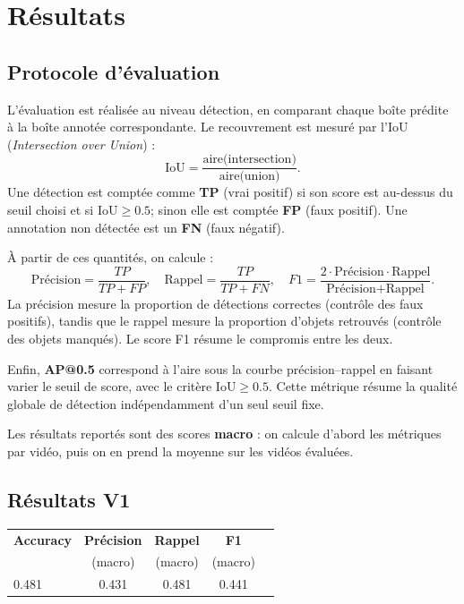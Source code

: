 \documentclass{article}
\begin{document}
\section{Résultats}
\subsection{Protocole d’évaluation}
L’évaluation est réalisée au niveau détection, en comparant chaque boîte prédite à la boîte annotée correspondante. Le recouvrement est mesuré par l’IoU (\textit{Intersection over Union}) :
\[
\mathrm{IoU}=\frac{\text{aire(intersection)}}{\text{aire(union)}}.
\]
Une détection est comptée comme \textbf{TP} (vrai positif) si son score est au-dessus du seuil choisi et si $\mathrm{IoU}\geq 0.5$; sinon elle est comptée \textbf{FP} (faux positif). Une annotation non détectée est un \textbf{FN} (faux négatif).

À partir de ces quantités, on calcule :
\[
\text{Précision}=\frac{TP}{TP+FP},
\quad
\text{Rappel}=\frac{TP}{TP+FN},
\quad
F1=\frac{2 \cdot \text{Précision}\cdot \text{Rappel}}{\text{Précision}+\text{Rappel}}.
\]
La précision mesure la proportion de détections correctes (contrôle des faux positifs), tandis que le rappel mesure la proportion d’objets retrouvés (contrôle des objets manqués). Le score F1 résume le compromis entre les deux.

Enfin, \textbf{AP@0.5} correspond à l’aire sous la courbe précision--rappel en faisant varier le seuil de score, avec le critère $\mathrm{IoU}\geq 0.5$. Cette métrique résume la qualité globale de détection indépendamment d’un seul seuil fixe.

Les résultats reportés sont des scores \textbf{macro} : on calcule d’abord les métriques par vidéo, puis on en prend la moyenne sur les vidéos évaluées.


\subsection{Résultats V1}

\begin{table}[h]
\centering
\begin{tabular}{lcccc}
\hline
\textbf{Accuracy} & \textbf{Précision} & \textbf{Rappel} & \textbf{F1} \\
& (macro) & (macro)& (macro)\\
\hline
0.481 & 0.431 & 0.481 & 0.441 \\
\hline
\end{tabular}
\end{table}
\end{document}
